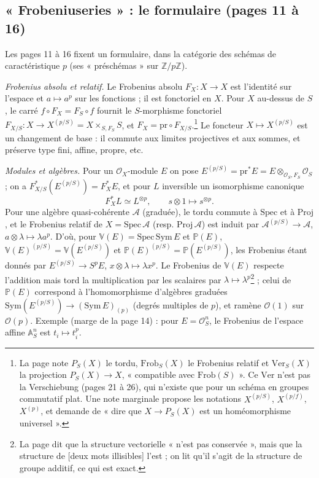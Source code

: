 \documentclass[11pt,a4paper]{article}
\begin{document}
\subsection*{« Frobeniuseries » : le formulaire (pages 11 à 16)}

Les pages 11 à 16 fixent un formulaire, dans la catégorie des schémas de
caractéristique $p$ (ses « préschémas » sur $\mathbb{Z}/p\mathbb{Z}$).

\emph{Frobenius absolu et relatif.} Le Frobenius absolu $F_X : X \to X$ est
l'identité sur l'espace et $a \mapsto a^{p}$ sur les fonctions ; il est
fonctoriel en $X$. Pour $X$ au-dessus de $S$, le carré $f \circ F_X = F_S
\circ f$ fournit le $S$-morphisme fonctoriel $F_{X/S} : X \to X^{(p/S)} = X
\times_{S, F_S} S$, et $F_X = \mathrm{pr} \circ F_{X/S}$.\footnote{La page note
$P_S(X)$ le tordu, $\mathrm{Frob}_S(X)$ le Frobenius relatif et
$\mathrm{Ver}_S(X)$ la projection $P_S(X) \to X$, « compatible avec
$\mathrm{Frob}(S)$ ». Ce $\mathrm{Ver}$ n'est pas la Verschiebung (pages 21 à
26), qui n'existe que pour un schéma en groupes commutatif plat. Une note
marginale propose les notations $X^{(p/S)}$, $X^{(p/f)}$, $X^{(p)}$, et demande
de « dire que $X \to P_S(X)$ est un homéomorphisme universel ».} Le foncteur
$X \mapsto X^{(p/S)}$ est un changement de base : il commute aux limites
projectives et aux sommes, et préserve type fini, affine, propre, etc.

\emph{Modules et algèbres.} Pour un $\mathcal{O}_X$-module $E$ on pose $E^{(p/S)}
= \mathrm{pr}^{*}E = E \otimes_{\mathcal{O}_S, F_S} \mathcal{O}_S$ ; on a
$F_{X/S}^{*}(E^{(p/S)}) = F_X^{*}E$, et pour $L$ inversible un isomorphisme
canonique
\[
F_X^{*}L \simeq L^{\otimes p}, \qquad s \otimes 1 \mapsto s^{\otimes p}.
\]
Pour une algèbre quasi-cohérente $\mathcal{A}$ (graduée), le tordu commute à
$\mathrm{Spec}$ et à $\mathrm{Proj}$, et le Frobenius relatif de $X =
\mathrm{Spec}\,\mathcal{A}$ (resp. $\mathrm{Proj}\,\mathcal{A}$) est induit par
$\mathcal{A}^{(p/S)} \to \mathcal{A}$, $a \otimes \lambda \mapsto \lambda a^{p}$.
D'où, pour $\mathbb{V}(E) = \mathrm{Spec}\,\mathrm{Sym}\,E$ et $\mathbb{P}(E)$,
$\mathbb{V}(E)^{(p/S)} = \mathbb{V}(E^{(p/S)})$ et $\mathbb{P}(E)^{(p/S)} =
\mathbb{P}(E^{(p/S)})$, les Frobenius étant donnés par $E^{(p/S)} \to S^{p}E$,
$x \otimes \lambda \mapsto \lambda x^{p}$. Le Frobenius de $\mathbb{V}(E)$
respecte l'addition mais tord la multiplication par les scalaires par $\lambda
\mapsto \lambda^{p}$\footnote{La page dit que la structure vectorielle « n'est
pas conservée », mais que la structure de [deux mots illisibles] l'est ; on
lit qu'il s'agit de la structure de groupe additif, ce qui est exact.} ; celui
de $\mathbb{P}(E)$ correspond à l'homomorphisme d'algèbres graduées
$\mathrm{Sym}(E^{(p/S)}) \to (\mathrm{Sym}\,E)_{(p)}$ (degrés multiples de
$p$), et ramène $\mathcal{O}(1)$ sur $\mathcal{O}(p)$. Exemple (marge de la
page 14) : pour $E = \mathcal{O}_S^{n}$, le Frobenius de l'espace affine
$\mathbb{A}^{n}_S$ est $t_i \mapsto t_i^{p}$.
\end{document}
